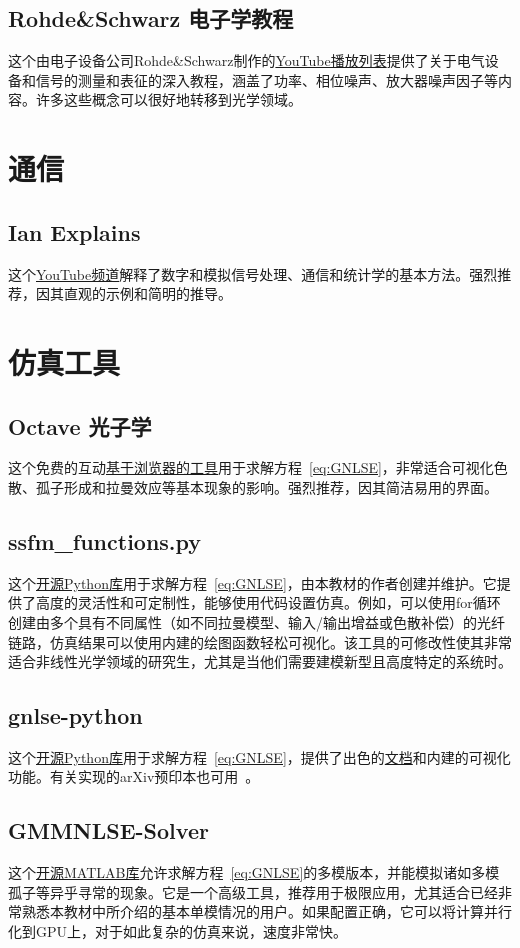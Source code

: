 \subsection*{Rohde\&Schwarz 电子学教程}
这个由电子设备公司Rohde\&Schwarz制作的\href{https://www.youtube.com/watch?v=rUDMo7hwihs&list=PLKxVoO5jUTlvsVtDcqrVn0ybqBVlLj2z8}{YouTube播放列表}提供了关于电气设备和信号的测量和表征的深入教程，涵盖了功率、相位噪声、放大器噪声因子等内容。许多这些概念可以很好地转移到光学领域。

\section{通信}

\subsection*{Ian Explains}
这个\href{https://www.youtube.com/@iain_explains/videos}{YouTube频道}解释了数字和模拟信号处理、通信和统计学的基本方法。强烈推荐，因其直观的示例和简明的推导。

\section{仿真工具}

\subsection*{Octave 光子学}
这个免费的互动\href{https://www.octavephotonics.com/nlse}{基于浏览器的工具}用于求解方程~\ref{eq:GNLSE}，非常适合可视化色散、孤子形成和拉曼效应等基本现象的影响。强烈推荐，因其简洁易用的界面。

\subsection*{ssfm\_functions.py}
这个\href{https://github.com/OleKrarup123/NLSE-vector-solver/tree/main}{开源Python库}用于求解方程~\ref{eq:GNLSE}，由本教材的作者创建并维护。它提供了高度的灵活性和可定制性，能够使用代码设置仿真。例如，可以使用for循环创建由多个具有不同属性（如不同拉曼模型、输入/输出增益或色散补偿）的光纤链路，仿真结果可以使用内建的绘图函数轻松可视化。该工具的可修改性使其非常适合非线性光学领域的研究生，尤其是当他们需要建模新型且高度特定的系统时。

\subsection*{gnlse-python}
这个\href{https://github.com/WUST-FOG/gnlse-python}{开源Python库}用于求解方程~\ref{eq:GNLSE}，提供了出色的\href{https://gnlse.readthedocs.io/en/latest/index.html}{文档}和内建的可视化功能。有关实现的arXiv预印本也可用~\cite{redman2021gnlsepythonopensourcesoftware}。

\subsection*{GMMNLSE-Solver}
这个\href{https://github.com/WiseLabAEP/GMMNLSE-Solver-FINAL}{开源MATLAB库}允许求解方程~\ref{eq:GNLSE}的多模版本，并能模拟诸如多模孤子等异乎寻常的现象。它是一个高级工具，推荐用于极限应用，尤其适合已经非常熟悉本教材中所介绍的基本单模情况的用户。如果配置正确，它可以将计算并行化到GPU上，对于如此复杂的仿真来说，速度非常快。
